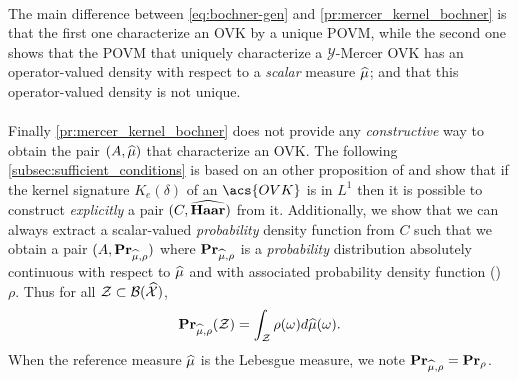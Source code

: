 \paragraph{}
The main difference between \cref{eq:bochner-gen} and \cref{pr:mercer_kernel_bochner} is that the first one characterize an \acs{OVK} by a unique \acf{POVM}, while the second one shows that the \acs{POVM} that uniquely characterize a $\mathcal{Y}$-Mercer \acs{OVK} has an operator-valued density with respect to a \emph{scalar} measure $\widehat{\mu}$; and that this operator-valued density is not unique.
\paragraph{}
Finally \cref{pr:mercer_kernel_bochner} does not provide any \emph{constructive} way to obtain the pair $(A,\widehat{\mu})$ that characterize an \acs{OVK}.
The following \cref{subsec:sufficient_conditions} is based on an other proposition of \citeauthor{carmeli2006vector} and show that if the kernel signature $K_e(\delta)$ of an $\acs{OVK}$ is in $L^1$ then it is possible to construct \emph{explicitly} a pair $(C,\widehat{\mathbf{Haar}})$ from it. Additionally, we show that we can always extract a scalar-valued \emph{probability} density function from $C$ such that we obtain a pair $(A,{\mathbf{{Pr}}}_{\widehat{\mu},\rho})$ where ${\mathbf{{Pr}}}_{\widehat{\mu},\rho}$ is a \emph{probability} distribution absolutely continuous with respect to $\widehat{\mu}$ and with associated probability density function (\pdf) $\rho$. Thus for all $\mathcal{Z}\subset\mathcal{B}(\widehat{\mathcal{X}})$,
\begin{dmath*}
\probability_{\dual{\mu},\rho}(\mathcal{Z})=\int_{\mathcal{Z}} \rho(\omega)d\dual{\mu}(\omega).
\end{dmath*}
When the reference measure $\widehat{\mu}$ is the Lebesgue measure, we note ${\mathbf{{Pr}}}_{\widehat{\mu},\rho}={\mathbf{{Pr}}}_\rho$.

